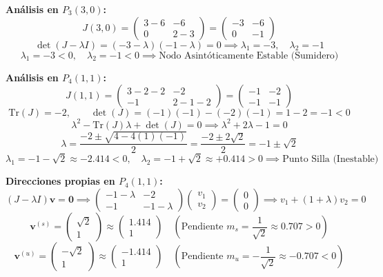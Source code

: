 \documentclass[11pt,a4paper]{article}
\newenvironment{solucion}[1][Solución Detallada]{%
    \vspace{1.5mm}%
    \noindent{\large\textbf{Solución:}}\par\vspace{1.5mm}%
}{%
    \par\vspace{3mm}%
}
\begin{document}
\begin{solucion}
\textbf{Análisis en $P_3(3, 0)$:}
\[
J(3, 0) = \begin{pmatrix} 3 - 6 & -6 \\ 0 & 2 - 3 \end{pmatrix} = \begin{pmatrix} -3 & -6 \\ 0 & -1 \end{pmatrix}
\]
\[
\det(J - \lambda I) = (-3 - \lambda)(-1 - \lambda) = 0 \implies \lambda_1 = -3, \quad \lambda_2 = -1
\]
\[
\boxed{\lambda_1 = -3 < 0, \quad \lambda_2 = -1 < 0 \implies \text{Nodo Asintóticamente Estable (Sumidero)}}
\]

\textbf{Análisis en $P_4(1, 1)$:}
\[
J(1, 1) = \begin{pmatrix} 3 - 2 - 2 & -2 \\ -1 & 2 - 1 - 2 \end{pmatrix} = \begin{pmatrix} -1 & -2 \\ -1 & -1 \end{pmatrix}
\]
\[
\mathrm{Tr}(J) = -2, \qquad \det(J) = (-1)(-1) - (-2)(-1) = 1 - 2 = -1 < 0
\]
\[
\lambda^2 - \mathrm{Tr}(J)\lambda + \det(J) = 0 \implies \lambda^2 + 2\lambda - 1 = 0
\]
\[
\lambda = \frac{-2 \pm \sqrt{4 - 4(1)(-1)}}{2} = \frac{-2 \pm 2\sqrt{2}}{2} = -1 \pm \sqrt{2}
\]
\[
\boxed{\lambda_1 = -1 - \sqrt{2} \approx -2.414 < 0, \quad \lambda_2 = -1 + \sqrt{2} \approx +0.414 > 0 \implies \text{Punto Silla (Inestable)}}
\]

\textbf{Direcciones propias en $P_4(1, 1)$:}
\[
(J - \lambda I)\mathbf{v} = \mathbf{0} \implies \begin{pmatrix} -1 - \lambda & -2 \\ -1 & -1 - \lambda \end{pmatrix}\begin{pmatrix} v_1 \\ v_2 \end{pmatrix} = \begin{pmatrix} 0 \\ 0 \end{pmatrix} \implies v_1 + (1+\lambda)v_2 = 0
\]
\[
\mathbf{v}^{(s)} = \begin{pmatrix} \sqrt{2} \\ 1 \end{pmatrix} \approx \begin{pmatrix} 1.414 \\ 1 \end{pmatrix} \quad (\text{Pendiente } m_s = \frac{1}{\sqrt{2}} \approx 0.707 > 0)
\]
\[
\mathbf{v}^{(u)} = \begin{pmatrix} -\sqrt{2} \\ 1 \end{pmatrix} \approx \begin{pmatrix} -1.414 \\ 1 \end{pmatrix} \quad (\text{Pendiente } m_u = -\frac{1}{\sqrt{2}} \approx -0.707 < 0)
\]


\end{solucion}
\end{document}
